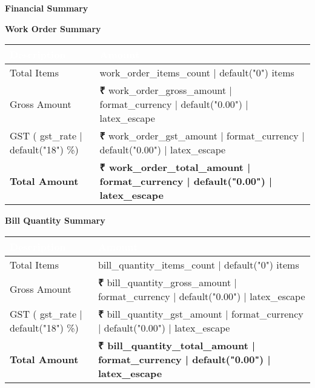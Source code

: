 \documentclass[a4paper,11pt]{article}
\newcommand{\rupee}{\textbf{₹}}
\newcommand{\primaryheader}[1]{\textcolor{primarygreen}{\textbf{\large #1}}}
\newcommand{\secondaryheader}[1]{\textcolor{secondarygreen}{\textbf{#1}}}
\begin{document}
\vspace{1cm}

\primaryheader{Financial Summary}
\vspace{0.3cm}

\secondaryheader{Work Order Summary}
\vspace{0.2cm}

\begin{longtable}{|p{6cm}|p{4cm}|}
\hline
\rowcolor{primarygreen}
\textcolor{white}{\textbf{Description}} & \textcolor{white}{\textbf{Amount}} \\
\hline
Total Items & {{ work_order_items_count | default("0") }} items \\
\hline
Gross Amount & \rupee{{ work_order_gross_amount | format_currency | default("0.00") | latex_escape }} \\
\hline
GST ({{ gst_rate | default("18") }}\%) & \rupee{{ work_order_gst_amount | format_currency | default("0.00") | latex_escape }} \\
\hline
\rowcolor{lightgreen}
\textbf{Total Amount} & \textbf{\rupee{{ work_order_total_amount | format_currency | default("0.00") | latex_escape }}} \\
\hline
\end{longtable}

\vspace{0.5cm}

\secondaryheader{Bill Quantity Summary}
\vspace{0.2cm}

\begin{longtable}{|p{6cm}|p{4cm}|}
\hline
\rowcolor{primarygreen}
\textcolor{white}{\textbf{Description}} & \textcolor{white}{\textbf{Amount}} \\
\hline
Total Items & {{ bill_quantity_items_count | default("0") }} items \\
\hline
Gross Amount & \rupee{{ bill_quantity_gross_amount | format_currency | default("0.00") | latex_escape }} \\
\hline
GST ({{ gst_rate | default("18") }}\%) & \rupee{{ bill_quantity_gst_amount | format_currency | default("0.00") | latex_escape }} \\
\hline
\rowcolor{lightgreen}
\textbf{Total Amount} & \textbf{\rupee{{ bill_quantity_total_amount | format_currency | default("0.00") | latex_escape }}} \\
\hline
\end{longtable}
\end{document}
